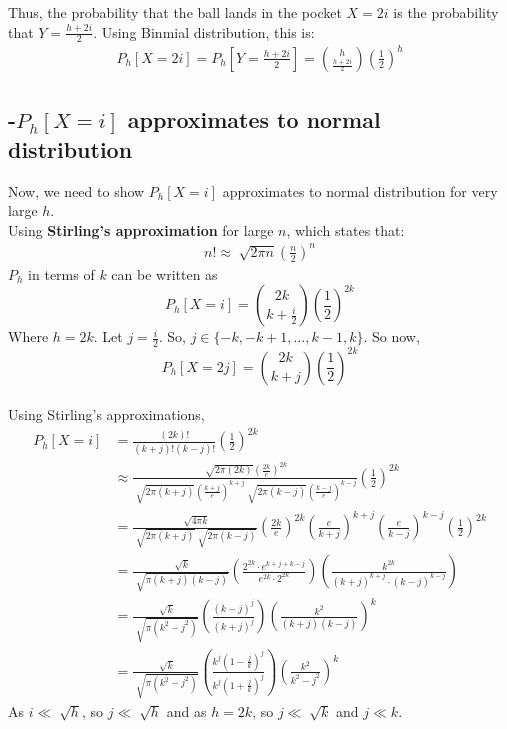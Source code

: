 \begin{solution}
	Thus, the probability that the ball lands in the pocket $X=2i$ is the
	probability that $Y = \frac{h+2i}{2}$. Using Binmial distribution, this
	is:
	\begin{align}
		P_h[X=2i]=P_h\left[Y=\frac{h+2i}{2}\right]=\binom{h}{\frac{h+2i}{2}}\left(\frac{1}{2}\right)^h
	\end{align}

	\subsection*{-$P_h[X=i]$ approximates to normal distribution }
	Now, we need to show $P_h[X=i]$ approximates to normal distribution for very large $h$.\\
	 Using \textbf{Stirling's approximation} for large $n$, which states that:
	 \begin{align}
	 	n!\approx \sqrt[]{2\pi n}\left(\frac{n}{2}\right)^n
	 \end{align}
	$P_h$ in terms of $k$ can be written as
	\[P_h[X=i] = \binom{2k}{k+\frac{i}{2}}\left(\frac{1}{2}\right)^{2k}\]
	Where $h=2k$. Let $j=\frac{i}{2}$. So, $j\in\{-k,-k+1,\ldots,k-1,k\}$. So now,
	\[P_h[X=2j] =  \binom{2k}{k+j}\left(\frac{1}{2}\right)^{2k}\]  \\
	Using Stirling's approximations,
	\begin{align}
		P_h[X=i] & = \frac{(2k)!}{(k+j)!(k-j)!}\left(\frac{1}{2}\right)^{2k} \\
		& \approx \frac{\sqrt[]{2\pi(2k)}\left(\frac{2k}{e}\right)^{2k}}{\sqrt[]{2\pi(k+j)}\left(\frac{k+j}{e}\right)^{k+j}\sqrt[]{2\pi(k-j)}\left(\frac{k-j}{e}\right)^{k-j}}\left(\frac{1}{2}\right)^{2k} \\
		& = \frac{\sqrt[]{4\pi k}}{\sqrt[]{2\pi (k+j)}\sqrt[]{2\pi (k-j)}} \left(\frac{2k}{e}\right)^{2k}\left(\frac{e}{k+j}\right)^{k+j}\left(\frac{e}{k-j}\right)^{k-j}\left(\frac{1}{2}\right)^{2k} \\
		& = \frac{\sqrt[]{k}}{\sqrt[]{\pi (k+j)(k-j)}}\left(\frac{2^{2k}\cdot e^{k+j+k-j}}{e^{2k}\cdot2^{2k}}\right) \left(\frac{k^{2k}}{(k+j)^{k+j}\cdot (k-j)^{k-j}}\right) \\
		& = \frac{\sqrt[]{k}}{\sqrt[]{\pi (k^2-j^2)}}\left(\frac{(k-j)^j}{(k+j)^j}\right)\left(\frac{k^2}{(k+j)(k-j)}\right)^k \\
		& = \frac{\sqrt[]{k}}{\sqrt[]{\pi (k^2-j^2)}}\left(\frac{k^j\left(1-\frac{j}{k}\right)^j}{k^j\left(1+\frac{j}{k}\right)^j}\right)\left(\frac{k^2}{k^2-j^2}\right)^k
	\end{align}
	As $i \ll \sqrt[]{h}$, so $j\ll \sqrt[]{h}$ and as $h=2k$, so $j\ll \sqrt[]{k}$ and $j\ll k$. \\

\end{solution}
